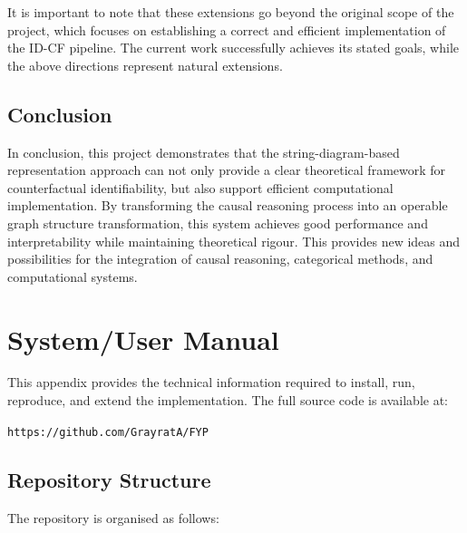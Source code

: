 \documentclass[a4paper]{report}
\begin{document}
It is important to note that these extensions go beyond the original scope of the project, which focuses on establishing a correct and efficient implementation of the ID-CF pipeline. 
The current work successfully achieves its stated goals, while the above directions represent natural extensions.

\section{Conclusion}
In conclusion, this project demonstrates that the string-diagram-based representation approach can not only provide a clear theoretical framework for counterfactual identifiability, but also support efficient computational implementation. By transforming the causal reasoning process into an operable graph structure transformation, this system achieves good performance and interpretability while maintaining theoretical rigour. This provides new ideas and possibilities for the integration of causal reasoning, categorical methods, and computational systems.


\nocite{10.1093/biomet/82.4.669}
\nocite{tikka2021cfid}
\nocite{huang2006completeness}
\nocite{Fritz_2020}
\nocite{koller2009probabilistic}




\appendix

\chapter{System/User Manual}
\label{app:system}

This appendix provides the technical information required to install, run, reproduce, and extend the implementation. 
The full source code is available at:

\begin{center}
\texttt{https://github.com/GrayratA/FYP}
\end{center}

\section{Repository Structure}

The repository is organised as follows:
\end{document}
